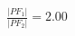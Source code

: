 \documentclass[preview]{standalone}
\begin{document}
\begin{align*}
\frac{|PF_1|}{|PF_2|} = 2.00
\end{align*}
\end{document}
